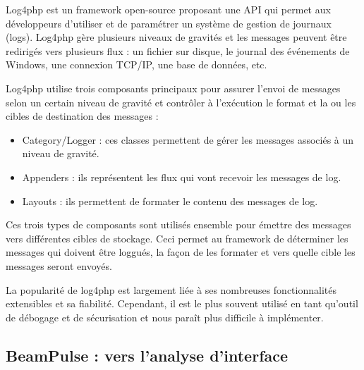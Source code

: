             Log4php est un framework open-source proposant une API qui permet aux développeurs d'utiliser et de paramétrer un système de gestion de journaux (logs). Log4php gère plusieurs niveaux de gravités et les messages peuvent être redirigés vers plusieurs flux : un fichier sur disque, le journal des événements de Windows, une connexion TCP/IP, une base de données, etc.
        
            Log4php utilise trois composants principaux pour assurer l'envoi de messages selon un certain niveau de gravité et contrôler à l'exécution le format et la ou les cibles de destination des messages :

            \begin{itemize}
                \item Category/Logger : ces classes permettent de gérer les messages associés à un niveau de gravité.
                \item Appenders : ils représentent les flux qui vont recevoir les messages de log.
                \item Layouts : ils permettent de formater le contenu des messages de log.

            \end{itemize}

            Ces trois types de composants sont utilisés ensemble pour émettre des messages vers différentes cibles de stockage. Ceci permet au framework de déterminer les messages qui doivent être loggués, la façon de les formater et vers quelle cible les messages seront envoyés.

            La popularité de log4php est largement liée à ses nombreuses fonctionnalités extensibles et sa fiabilité. Cependant, il est le plus souvent utilisé en tant qu'outil de débogage et de sécurisation et nous paraît plus difficile à implémenter.
        
        \subsection{BeamPulse : vers l'analyse d'interface}
        
